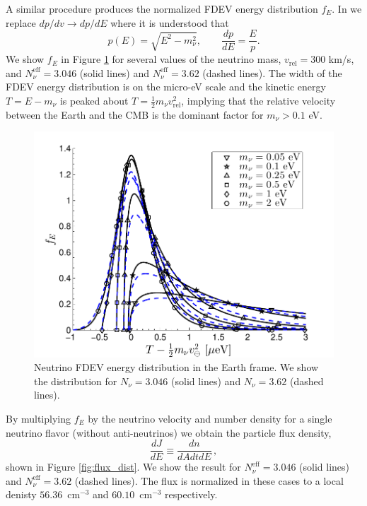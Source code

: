 A similar procedure produces the normalized FDEV energy distribution $f_E$.  In  we replace $dp/dv\to dp/dE$ where it is understood that 
\begin{equation}
p(E)=\sqrt{E^2-m_\nu^2},\qquad \frac{dp}{dE}=\frac{E}{p}.
\end{equation}
We show $f_E$ in Figure \ref{fig:E_dist_300}  for several values of the neutrino mass, $v_{\text{rel}}=300$ km/s, and $N_\nu^{\mathrm{eff}}=3.046$ (solid lines) and $N_\nu^{\mathrm{eff}}=3.62$ (dashed lines). The width of the FDEV energy distribution is on the micro-eV scale and the kinetic energy $T=E-m_\nu$ is peaked about $T=\frac{1}{2}m_\nu v_{\text{rel}}^2$, implying that the relative velocity between the Earth and the CMB is the dominant factor for $m_\nu>0.1$ eV.

\begin{figure}
\centerline{\includegraphics[width=0.9\linewidth]{04-birrell/NeutrinoDistributionToday/Figures/E_dist_300.pdf}}
\caption{Neutrino FDEV energy distribution in the Earth frame. We show the distribution for $N_\nu=3.046$ (solid lines) and $N_\nu=3.62$ (dashed lines). }
\label{fig:E_dist_300}
 \end{figure}

By multiplying $f_E$ by the neutrino velocity and number density for a single neutrino flavor (without anti-neutrinos) we obtain the particle flux density,
 \begin{equation}
 \frac{dJ}{dE}\equiv\frac{dn}{dAdtdE}\,,
\end{equation} 
shown in Figure \ref{fig:flux_dist}. We show the result for $N_\nu^{\mathrm{eff}}=3.046$ (solid lines) and $N_\nu^{\mathrm{eff}}=3.62$ (dashed lines). The flux is normalized in these cases to a local denisty $56.36$~cm${}^{-3}$ and $60.10$~cm${}^{-3}$ respectively. 


